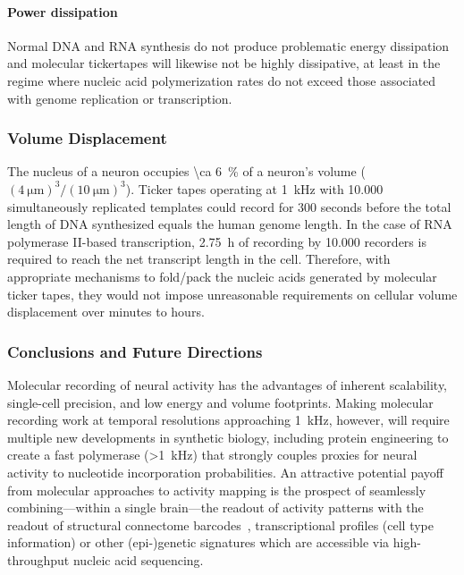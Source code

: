 \paragraph{Power dissipation}
Normal DNA and RNA synthesis do not produce problematic energy dissipation and molecular tickertapes will likewise not be highly dissipative, at least in the regime where nucleic acid polymerization rates do not exceed those associated with genome replication or transcription.

\subsubsection{Volume Displacement}

The nucleus of a neuron occupies \SI{\ca 6}{\percent} of a neuron's volume ($(\SI{4}{\um})^3/(\SI{10}{\um})^3$).
Ticker tapes operating at \SI{1}{\kHz} with \num{10,000} simultaneously replicated templates could record for \num{300} seconds before the total length of DNA synthesized equals the human genome length.
In the case of RNA polymerase II-based transcription, \SI{2.75}{\hour} of recording by \num{10,000} recorders is required to reach the net transcript length in the cell.
Therefore, with appropriate mechanisms to fold/pack the nucleic acids generated by molecular ticker tapes, they would not impose unreasonable requirements on cellular volume displacement over minutes to hours.

\subsubsection{Conclusions and Future Directions}

Molecular recording of neural activity has the advantages of inherent scalability, single-cell precision, and low energy and volume footprints.
Making molecular recording work at temporal resolutions approaching \SI{1}{\kHz}, however, will require multiple new developments in synthetic biology, including protein engineering to create a fast polymerase (\SI{>1}{\kHz}) that strongly couples proxies for neural activity to nucleotide incorporation probabilities.
An attractive potential payoff from molecular approaches to activity mapping is the prospect of seamlessly combining---within a single brain---the readout of activity patterns with the readout of structural connectome barcodes~\cite{zador12}, transcriptional profiles (cell type information) or other (epi-)genetic signatures which are accessible via high-throughput nucleic acid sequencing.


